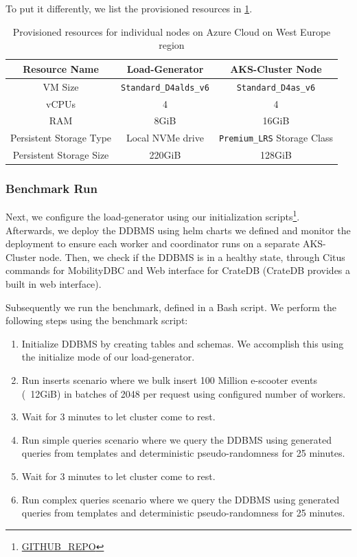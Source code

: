 To put it differently, we list the provisioned resources in \cref{tab:node-resources}.

\begin{table}[ht]
  \centering
  \begin{tabular}{|c|c|c|}
    \hline
	  Resource Name & Load-Generator & AKS-Cluster Node \\
    \hline
	  VM Size & \verb|Standard_D4alds_v6| & \verb|Standard_D4as_v6| \\
	  vCPUs & 4 & 4 \\
	  RAM & 8GiB & 16GiB \\
	  Persistent Storage Type & Local NVMe drive & \verb|Premium_LRS| Storage Class \\
	  Persistent Storage Size & 220GiB & 128GiB \\
    \hline
  \end{tabular}
  \caption{Provisioned resources for individual nodes on Azure Cloud on West Europe region}
  \label{tab:node-resources}
\end{table}

\subsubsection{Benchmark Run}

Next, we configure the load-generator using our initialization scripts\footnote{\url{GITHUB_REPO}}.
Afterwards, we deploy the DDBMS using helm charts we defined and monitor the deployment to ensure each worker and coordinator runs on a separate AKS-Cluster node.
Then, we check if the DDBMS is in a healthy state, through Citus commands for MobilityDBC and Web interface for CrateDB (CrateDB provides a built in web interface).

Subsequently we run the benchmark, defined in a Bash script.
We perform the following steps using the benchmark script:
\begin{enumerate}
	\item Initialize DDBMS by creating tables and schemas. We accomplish this using the initialize mode of our load-generator.
	\item Run inserts scenario where we bulk insert 100 Million e-scooter events (~12GiB) in batches of 2048 per request using configured number of workers.
	\item Wait for 3 minutes to let cluster come to rest.
	\item Run simple queries scenario where we query the DDBMS using generated queries from templates and deterministic pseudo-randomness for 25 minutes.
	\item Wait for 3 minutes to let cluster come to rest.
	\item Run complex queries scenario where we query the DDBMS using generated queries from templates and deterministic pseudo-randomness for 25 minutes.
\end{enumerate}

